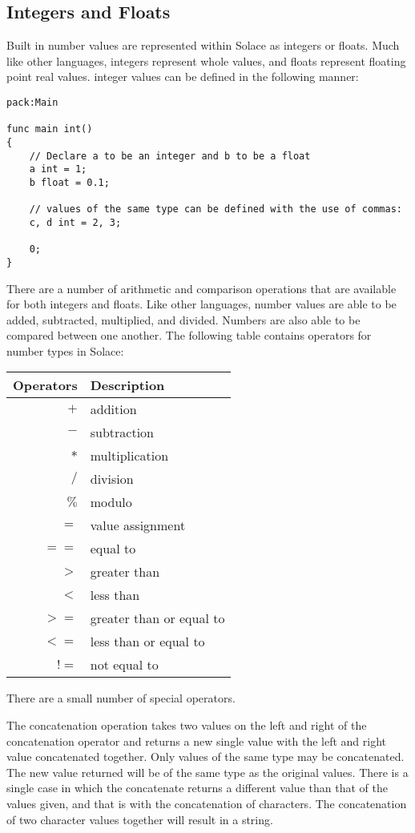 \documentclass{article}
\begin{document}
\subsection{Integers and Floats}

Built in number values are represented within Solace as integers or floats. Much like other
languages, integers represent whole values, and floats represent floating point real values.
integer values can be defined in the following manner:

\begin{lstlisting}
pack:Main

func main int()
{
	// Declare a to be an integer and b to be a float
	a int = 1;
	b float = 0.1;
	
	// values of the same type can be defined with the use of commas:
	c, d int = 2, 3;
	
	0;
}
\end{lstlisting}

There are a number of arithmetic and comparison operations that are available for both integers
and floats. Like other languages, number values are able to be added, subtracted, multiplied,
and divided. Numbers are also able to be compared between one another. The following table 
contains operators for number types in Solace:

\begin{center}
\begin{tabular}{|r|l|}
	\hline
	Operators & Description \\
	\hline
	\hline
	$+$ & addition \\
	$-$ & subtraction \\
	$*$ & multiplication \\
	$/$ & division \\
	$\%$ & modulo \\
	\hline
	$=$ & value assignment \\
	$==$ & equal to \\
	$>$ & greater than \\
	$<$ & less than \\
	$>=$ & greater than or equal to \\
	$<=$ & less than or equal to \\
	$!=$ & not equal to \\
	\hline
\end{tabular}
\end{center}

There are a small number of special operators. 

The concatenation operation takes two values
on the left and right of the concatenation operator and returns a new single value with
the left and right value concatenated together. Only values of the same type may be
concatenated. The new value returned will be of the same type as the original values.
There is a single case in which the concatenate returns a different value than that of the
values given, and that is with the concatenation of characters. The concatenation of two
character values together will result in a string.
\end{document}
